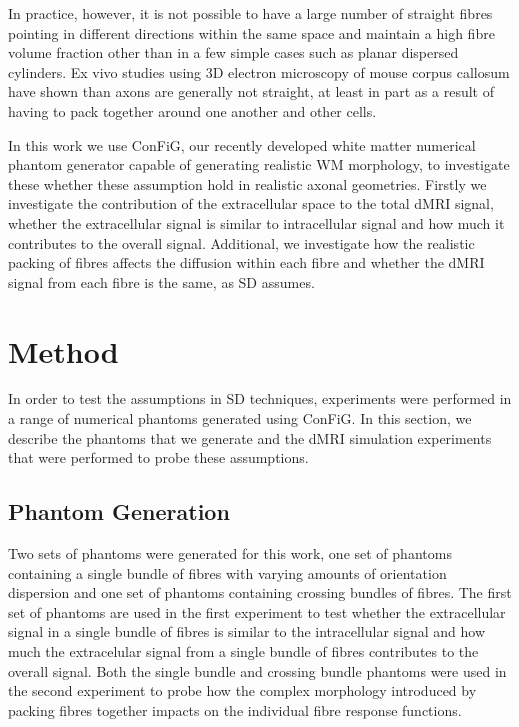 In practice, however, it is not possible to have a large number of straight fibres pointing in different directions within the same space and maintain a high fibre volume fraction other than in a few simple cases such as planar dispersed cylinders. Ex vivo studies using 3D electron microscopy of mouse corpus callosum have shown than axons are generally not straight, at least in part as a result of having to pack together around one another and other cells.

In this work we use \ac{ConFiG}, our recently developed white matter numerical phantom generator capable of generating realistic WM morphology, to investigate these whether these assumption hold in realistic axonal geometries. Firstly we investigate the contribution of the extracellular space to the total \ac{dMRI} signal, whether the extracellular signal is similar to intracellular signal and how much it contributes to the overall signal. Additional, we investigate how the realistic packing of fibres affects the diffusion within each fibre and whether the dMRI signal from each fibre is the same, as \ac{SD} assumes.

\section{Method}
\label{sec:frf_method}
In order to test the assumptions in \ac{SD} techniques, experiments were performed in a range of numerical phantoms generated using ConFiG. In this section, we describe the phantoms that we generate and the \ac{dMRI} simulation experiments that were performed to probe these assumptions. 

\subsection{Phantom Generation}
\label{sec:frf_phantom_generation}
Two sets of phantoms were generated for this work, one set of phantoms containing a single bundle of fibres with varying amounts of orientation dispersion and one set of phantoms containing crossing bundles of fibres. The first set of phantoms are used in the first experiment to test whether the extracellular signal in a single bundle of fibres is similar to the intracellular signal and how much the extracelular signal from a single bundle of fibres contributes to the overall signal. Both the single bundle and crossing bundle phantoms were used in the second experiment to probe how the complex morphology introduced by packing fibres together impacts on the individual fibre response functions. 

